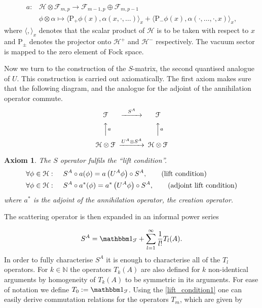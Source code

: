 \documentclass[b5paper,draft,openbib,12pt]{memoir}
\newtheorem{axiom}{Axiom}
\newcommand{\id}{{\mathbbm 1}}
\begin{document}
\begin{equation}
\begin{aligned}
a: &\mathcal{H}\otimes \mathcal{F}_{m,p} \rightarrow \mathcal{F}_{m-1,p}\oplus \mathcal{F}_{m,p-1}\\
&\phi \otimes \alpha \mapsto \langle \mathrm{P}_+ \phi (x),\alpha (x,\cdot,\dots)\rangle_x + \langle \mathrm{P}_- \phi (x),\alpha (\cdot,\dots, \cdot, x)\rangle_x,
\end{aligned}
\end{equation}
where \(\langle, \rangle_x\) denotes that the scalar product of \(\mathcal{H}\) is to be taken with respect to \(x\) and \(\mathrm{P}_{\pm}\) denotes the projector onto \(\mathcal{H}^+\) and \(\mathcal{H}^-\) respectively. The vacuum sector is mapped to the zero element of Fock space. 

Now we turn to the construction of the \(S\)-matrix, the second quantised analogue of \(U\). This construction is carried out axiomatically. The first axiom makes sure that the following diagram, and the analogue for the adjoint of the annihilation operator commute.
\begin{equation}
\begin{CD}								%
\mathcal{F}     @>S^A>>  \mathcal{F}\\
@AAaA        @AAaA\\
\mathcal{H}\otimes \mathcal{F}     @>U^A\otimes S^A>>  \mathcal{H}\otimes \mathcal{F} 
\end{CD}
\end{equation}
\begin{axiom}
The \(S\) operator fulfils the ``lift condition''.
\begin{align}\label{lift_condition1}
\forall \phi\in \mathcal{H}:& \hspace{0.5cm} S^A \circ a(\phi)=a\left( U^A \phi \right)  \circ S^A,\tag{lift condition}\\
\label{lift_condition2}
\forall \phi\in \mathcal{H}:& \hspace{0.5cm} S^A \circ a^*(\phi)=a^*\left( U^A \phi \right)  \circ S^A,\tag{adjoint lift condition}
\end{align}
where \(a^*\) is the adjoint of the annihilation operator, the creation operator. 
\end{axiom}
The scattering operator is then expanded in an informal 
power series

\begin{equation}\label{S_expansion}
S^A=\id_\mathcal{F}+\sum_{l=1}^\infty \frac{1}{l!} T_l(A).
\end{equation}
In order to fully characterise \(S^A\) it is enough to characterise all of the \(T_l\) operators. For \(k\in \mathbb{N}\)
the operators \(T_k (A)\) are also defined for \(k\) non-identical arguments by homogeneity of
\(T_k(A)\) to be symmetric in its arguments. For ease of notation we define \(T_0:=\id_\mathcal{F}\).
Using the \eqref{lift_condition1} one can easily derive commutation relations for the operators 
\(T_m\), which are given by
\end{document}
